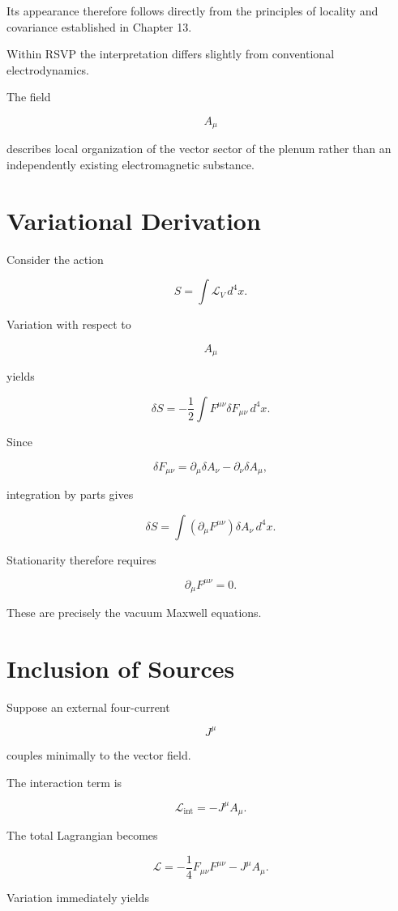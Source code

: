 \documentclass[11pt,oneside]{book}
\numberwithin{equation}{chapter}
\theoremstyle{definition}
\theoremstyle{plain}
\begin{document}
Its appearance therefore follows directly from the principles of locality
and covariance established in Chapter 13.

Within RSVP the interpretation differs slightly from conventional
electrodynamics.

The field

\[
A_\mu
\]

describes local organization of the vector sector of the plenum rather than
an independently existing electromagnetic substance.

\section{Variational Derivation}

Consider the action

\[
S
=
\int
\mathcal L_V
\,d^4x.
\]

Variation with respect to

\[
A_\mu
\]

yields

\[
\delta S
=
-
\frac12
\int
F^{\mu\nu}
\delta F_{\mu\nu}
\,d^4x.
\]

Since

\[
\delta F_{\mu\nu}
=
\partial_\mu
\delta A_\nu
-
\partial_\nu
\delta A_\mu,
\]

integration by parts gives

\[
\delta S
=
\int
(\partial_\mu F^{\mu\nu})
\delta A_\nu
\,d^4x.
\]

Stationarity therefore requires

\[
\boxed{
\partial_\mu
F^{\mu\nu}
=
0.
}
\]

These are precisely the vacuum Maxwell equations.

\section{Inclusion of Sources}

Suppose an external four-current

\[
J^\mu
\]

couples minimally to the vector field.

The interaction term is

\[
\mathcal L_{\mathrm{int}}
=
-
J^\mu
A_\mu.
\]

The total Lagrangian becomes

\[
\mathcal L
=
-
\frac14
F_{\mu\nu}F^{\mu\nu}
-
J^\mu
A_\mu.
\]

Variation immediately yields
\end{document}
